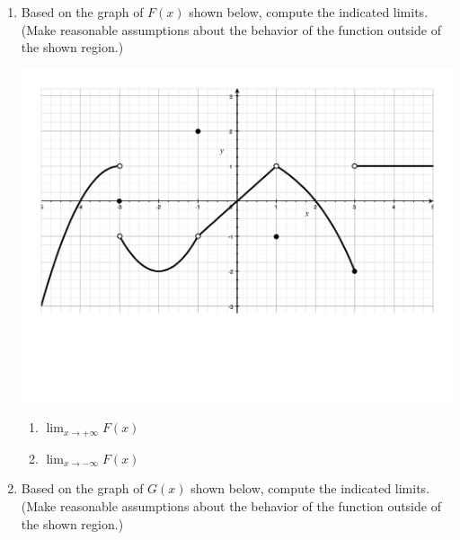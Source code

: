 \documentclass[12pt]{article}
\newif\ifans
\begin{document}
\begin{enumerate}

\item Based on the graph of $F(x)$ shown below, compute the indicated limits.  (Make reasonable assumptions about the behavior of the function outside of the shown region.)

\begin{center}
\includegraphics[scale=0.5]{Limits1.pdf}
\end{center}

\begin{enumerate}

\item $\displaystyle \lim_{x \rightarrow +\infty}{F(x)}$

\ifans{\fbox{1}} \fi

\item $\displaystyle \lim_{x \rightarrow -\infty}{F(x)}$

\ifans{\fbox{$-\infty$}} \fi

\end{enumerate}

\newpage

\item Based on the graph of $G(x)$ shown below, compute the indicated limits.  (Make reasonable assumptions about the behavior of the function outside of the shown region.)


\end{enumerate}
\end{document}
